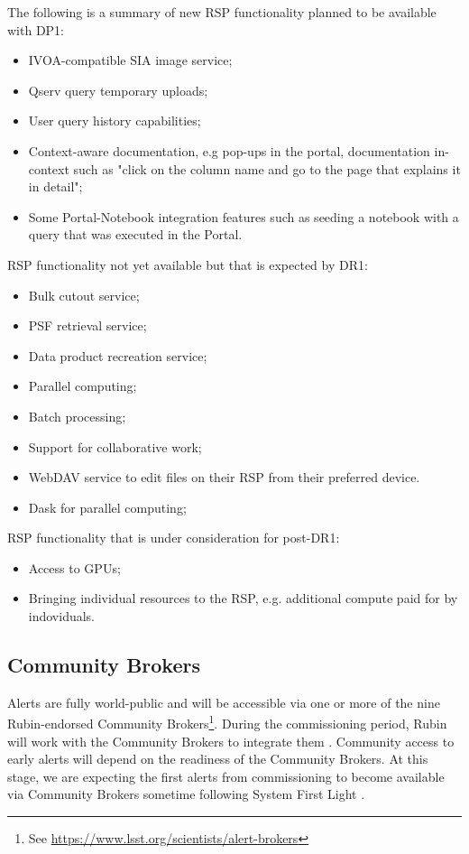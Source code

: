 The following is a summary of new RSP functionality planned to be available with  DP1: 
\begin{itemize}
\item IVOA-compatible SIA image service;
\item Qserv query temporary uploads;
\item User query history capabilities;
\item Context-aware documentation, e.g pop-ups in the portal, documentation in-context such as  "click on the column name and go to the page that explains it in detail";
\item Some Portal-Notebook integration features such as  seeding a notebook with a query that was executed in the Portal. 
\end{itemize}

RSP functionality not yet available but that is expected by DR1:
\begin{itemize}
\item Bulk cutout service;
\item PSF retrieval service;
\item Data product recreation service; 
\item Parallel computing;
\item Batch processing; 
\item Support for collaborative work;
\item WebDAV service to edit files on their RSP from their preferred device. 
\item Dask for parallel computing;
\end{itemize} 


RSP functionality that is under consideration for post-DR1:
\begin{itemize}
\item Access to GPUs;
\item Bringing individual resources to the RSP, e.g. additional compute paid for by indoviduals. 
\end{itemize} 

\subsection{Community Brokers }
Alerts are fully world-public and will be accessible via one or more of the nine Rubin-endorsed Community Brokers\footnote{See \url{https://www.lsst.org/scientists/alert-brokers}}.
During the commissioning period, Rubin will work with the Community Brokers to integrate them .
Community access to early alerts will depend on the readiness of the Community Brokers. 
At this stage, we are expecting the first alerts from commissioning to become available via Community Brokers sometime following System First Light . 
